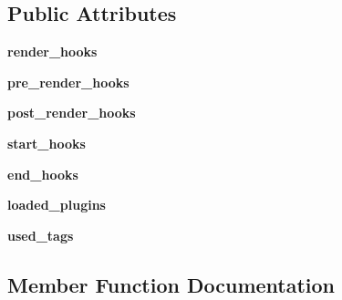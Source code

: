 \subsection*{Public Attributes}
\begin{DoxyCompactItemize}
\item 
\hypertarget{classtexla_1_1Renderers_1_1Renderer_1_1Renderer_a67f648f712e75417371647e0c80cc4d6}{}\label{classtexla_1_1Renderers_1_1Renderer_1_1Renderer_a67f648f712e75417371647e0c80cc4d6} 
{\bfseries render\+\_\+hooks}
\item 
\hypertarget{classtexla_1_1Renderers_1_1Renderer_1_1Renderer_a9817075b382f7fa1e523d45ceda34120}{}\label{classtexla_1_1Renderers_1_1Renderer_1_1Renderer_a9817075b382f7fa1e523d45ceda34120} 
{\bfseries pre\+\_\+render\+\_\+hooks}
\item 
\hypertarget{classtexla_1_1Renderers_1_1Renderer_1_1Renderer_a41343907b1bd157e20b8a59e02952589}{}\label{classtexla_1_1Renderers_1_1Renderer_1_1Renderer_a41343907b1bd157e20b8a59e02952589} 
{\bfseries post\+\_\+render\+\_\+hooks}
\item 
\hypertarget{classtexla_1_1Renderers_1_1Renderer_1_1Renderer_afab236e28ee034c4fa98de6aa0cea432}{}\label{classtexla_1_1Renderers_1_1Renderer_1_1Renderer_afab236e28ee034c4fa98de6aa0cea432} 
{\bfseries start\+\_\+hooks}
\item 
\hypertarget{classtexla_1_1Renderers_1_1Renderer_1_1Renderer_add33cdbfb21b10e4cb7c4cc0591a590e}{}\label{classtexla_1_1Renderers_1_1Renderer_1_1Renderer_add33cdbfb21b10e4cb7c4cc0591a590e} 
{\bfseries end\+\_\+hooks}
\item 
\hypertarget{classtexla_1_1Renderers_1_1Renderer_1_1Renderer_aae7192fca7376ffb380c73155721ab68}{}\label{classtexla_1_1Renderers_1_1Renderer_1_1Renderer_aae7192fca7376ffb380c73155721ab68} 
{\bfseries loaded\+\_\+plugins}
\item 
\hypertarget{classtexla_1_1Renderers_1_1Renderer_1_1Renderer_a1cb0d0cfd8fcb07a31b0b3f69570e679}{}\label{classtexla_1_1Renderers_1_1Renderer_1_1Renderer_a1cb0d0cfd8fcb07a31b0b3f69570e679} 
{\bfseries used\+\_\+tags}
\end{DoxyCompactItemize}


\subsection{Member Function Documentation}
\hypertarget{classtexla_1_1Renderers_1_1Renderer_1_1Renderer_aa5ac1cc3c4e118189bd4497ed03564dd}{}\label{classtexla_1_1Renderers_1_1Renderer_1_1Renderer_aa5ac1cc3c4e118189bd4497ed03564dd} 
